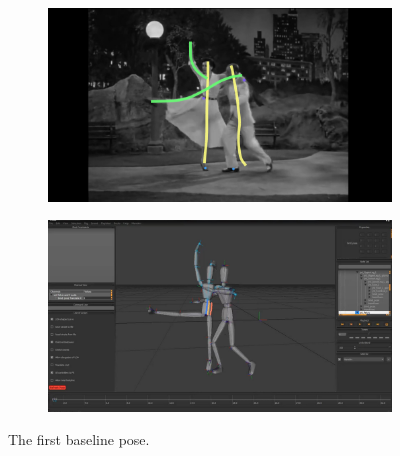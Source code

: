 \begin{figure}[h!]
	\centering
        \begin{subfigure}[b!]{0.45\textwidth}
        	\centering
                \includegraphics[width=\linewidth]{img/keyframe_case_9_(4)}
        \end{subfigure}
        \quad
        \begin{subfigure}[b!]{0.45\textwidth}
        	\centering
                \includegraphics[width=\linewidth]{img/baselinepose1}
        \end{subfigure}%
        \caption{The first baseline pose.}
	\label{fig:bpose1}
\end{figure}

